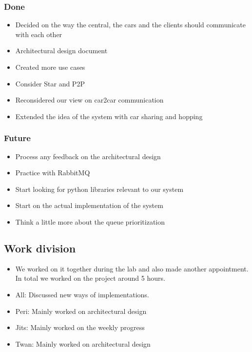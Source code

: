 \documentclass[a4paper]{article}
\begin{document}
\subsubsection*{Done}
\begin{itemize}
    \item Decided on the way the central, the cars and the clients should communicate with each other
    \item Architectural design document
    \item Created more use cases
    \item Consider Star and P2P
    \item Reconsidered our view on car2car communication
    \item Extended the idea of the system with car sharing and hopping
\end{itemize}

\subsubsection*{Future}
\begin{itemize}
    \item Process any feedback on the architectural design
    \item Practice with RabbitMQ
	\item Start looking for python libraries relevant to our system
    \item Start on the actual implementation of the system
    \item Think a little more about the queue prioritization 
\end{itemize}

\subsection*{Work division}
\begin{itemize}
	\item We worked on it together during the lab and also made another appointment. In total we worked on the project around 5 hours. 
	\item All: Discussed new ways of implementations. 
    \item Peri: Mainly worked on architectural design
    \item Jits: Mainly worked on the weekly progress
    \item Twan: Mainly worked on architectural design
\end{itemize}
\end{document}
